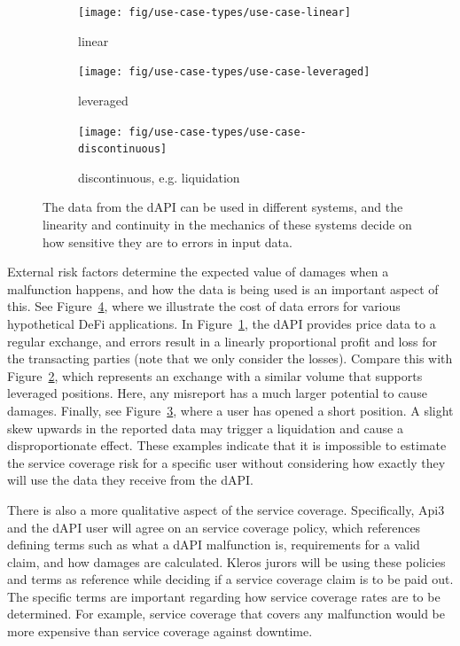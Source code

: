 \documentclass[11pt]{article}
\begin{document}
\begin{figure}[!t]
     \centering
     \begin{subfigure}{0.38\textwidth}
         \centering
         \texttt{[image: fig/use-case-types/use-case-linear]}
         \caption{linear}
         \label{fig:use-case-linear}
     \end{subfigure}
     
     \begin{subfigure}{0.38\textwidth}
         \centering
         \texttt{[image: fig/use-case-types/use-case-leveraged]}
         \caption{leveraged}
         \label{fig:use-case-leveraged}
     \end{subfigure}
     \begin{subfigure}{0.38\textwidth}
         \centering
         \texttt{[image: fig/use-case-types/use-case-discontinuous]}
         \caption{discontinuous, e.g. liquidation}
         \label{fig:use-case-discontinuous}
     \end{subfigure}
    \caption{The data from the dAPI can be used in different systems, and the linearity and continuity in the mechanics of these systems decide on how sensitive they are to errors in input data.}
    \label{fig:use-case-types}
\end{figure}

External risk factors determine the expected value of damages when a malfunction happens, and how the data is being used is an important aspect of this.
See Figure~\ref{fig:use-case-types}, where we illustrate the cost of data errors for various hypothetical DeFi applications.
In Figure~\ref{fig:use-case-linear}, the dAPI provides price data to a regular exchange, and errors result in a linearly proportional profit and loss for the transacting parties (note that we only consider the losses).
Compare this with Figure~\ref{fig:use-case-leveraged}, which represents an exchange with a similar volume that supports leveraged positions.
Here, any misreport has a much larger potential to cause damages.
Finally, see Figure~\ref{fig:use-case-discontinuous}, where a user has opened a short position.
A slight skew upwards in the reported data may trigger a liquidation and cause a disproportionate effect.
These examples indicate that it is impossible to estimate the service coverage risk for a specific user without considering how exactly they will use the data they receive from the dAPI.

There is also a more qualitative aspect of the service coverage.
Specifically, Api3 and the dAPI user will agree on an service coverage policy, which references defining terms such as what a dAPI malfunction is, requirements for a valid claim, and how damages are calculated.
Kleros jurors will be using these policies and terms as reference while deciding if a service coverage claim is to be paid out.
The specific terms are important regarding how service coverage rates are to be determined.
For example, service coverage that covers any malfunction would be more expensive than service coverage against downtime.
\end{document}
